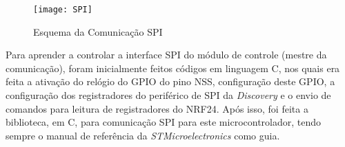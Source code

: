 \begin{figure}
	\centering
	\texttt{[image: SPI]}
	\caption{Esquema da Comunicação SPI}
	\label{fig:spi}
\end{figure}

Para aprender a controlar a interface SPI do módulo de controle (mestre da comunicação), foram inicialmente feitos códigos em linguagem C, nos quais era feita a ativação do relógio do GPIO do pino NSS, configuração deste GPIO, a configuração dos registradores do periférico de SPI da \textit{Discovery} e o envio de comandos para leitura de registradores do NRF24.
Após isso, foi feita a biblioteca, em C, para comunicação SPI para este microcontrolador, tendo sempre o manual de referência da \textit{STMicroelectronics} como guia.


